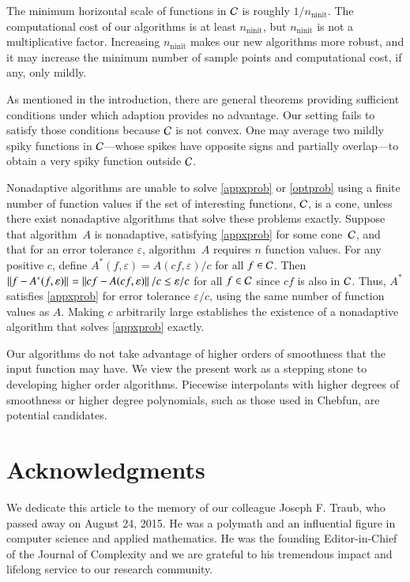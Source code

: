 \documentclass[review]{elsarticle}
\newcommand{\abstol}{\varepsilon}
\theoremstyle{definition}
\DeclareMathOperator{\ninit}{ninit}
\begin{document}
The minimum horizontal scale of functions in $\mathcal{C}$ is roughly $1/n_{\ninit}$. The
computational cost of our algorithms is at least $n_{\ninit}$, but $n_{\ninit}$ is not a
multiplicative factor. Increasing $n_{\ninit}$ makes our new algorithms more robust, and it may
increase the minimum number of sample points and %
computational cost, if any, only mildly.

As mentioned in the introduction, there are general theorems providing sufficient
conditions under which adaption provides
no advantage. Our setting fails to satisfy those conditions because $\mathcal{C}$ is not
convex. One may average two mildly spiky functions in $\mathcal{C}$---whose spikes have
opposite signs and partially overlap---to obtain a very spiky function outside
$\mathcal{C}$.

Nonadaptive algorithms are unable to solve \eqref{appxprob} or
\eqref{optprob} using a finite number of function values if the set of
interesting functions, $\mathcal{C}$, is a cone, unless there exist nonadaptive
algorithms that solve these problems exactly. Suppose that algorithm~$A$ is nonadaptive, satisfying \eqref{appxprob} for some cone~$\mathcal{C}$, and that for an error
tolerance $\abstol$, algorithm~$A$ requires $n$ function values. For any positive $c$,
define $A^*(f,\abstol) = A(cf,\abstol)/c$ for all $f \in \mathcal{C}$. Then $\norm{f -
A^*(f,\abstol)} = \norm{cf - A(cf,\abstol)}/c\le \abstol/c$ for all $f \in \mathcal{C}$
since $cf$ is also in $\mathcal{C}$. Thus, $A^*$ satisfies \eqref{appxprob} for error
tolerance $\abstol/c$, using the same number of function values as $A$.
Making $c$ arbitrarily large establishes the existence of a nonadaptive
algorithm that solves \eqref{appxprob} exactly.

Our algorithms do not take advantage of higher orders of
smoothness that the input function may have. We view the present work as a
stepping stone to developing higher order algorithms. Piecewise interpolants
with higher degrees of smoothness or higher degree polynomials, such as those used
in Chebfun, are potential candidates.


\section*{Acknowledgments}

We dedicate this article to the memory of our colleague Joseph F. Traub, who
passed away on August 24, 2015. He was a polymath and an influential figure in
computer science and applied mathematics. He was the founding Editor-in-Chief of
the Journal of Complexity and we are grateful to his tremendous impact and lifelong
service to our research community.
\end{document}
